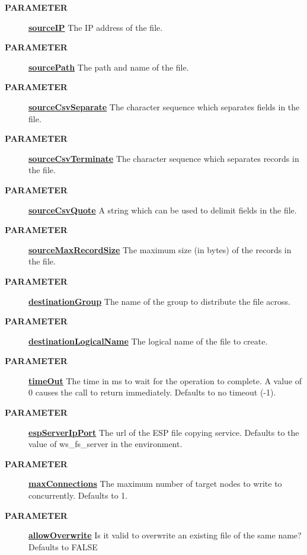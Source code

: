 \par
\begin{description}
\item [\colorbox{tagtype}{\color{white} \textbf{\textsf{PARAMETER}}}] \textbf{\underline{sourceIP}} The IP address of the file.
\item [\colorbox{tagtype}{\color{white} \textbf{\textsf{PARAMETER}}}] \textbf{\underline{sourcePath}} The path and name of the file.
\item [\colorbox{tagtype}{\color{white} \textbf{\textsf{PARAMETER}}}] \textbf{\underline{sourceCsvSeparate}} The character sequence which separates fields in the file.
\item [\colorbox{tagtype}{\color{white} \textbf{\textsf{PARAMETER}}}] \textbf{\underline{sourceCsvTerminate}} The character sequence which separates records in the file.
\item [\colorbox{tagtype}{\color{white} \textbf{\textsf{PARAMETER}}}] \textbf{\underline{sourceCsvQuote}} A string which can be used to delimit fields in the file.
\item [\colorbox{tagtype}{\color{white} \textbf{\textsf{PARAMETER}}}] \textbf{\underline{sourceMaxRecordSize}} The maximum size (in bytes) of the records in the file.
\item [\colorbox{tagtype}{\color{white} \textbf{\textsf{PARAMETER}}}] \textbf{\underline{destinationGroup}} The name of the group to distribute the file across.
\item [\colorbox{tagtype}{\color{white} \textbf{\textsf{PARAMETER}}}] \textbf{\underline{destinationLogicalName}} The logical name of the file to create.
\item [\colorbox{tagtype}{\color{white} \textbf{\textsf{PARAMETER}}}] \textbf{\underline{timeOut}} The time in ms to wait for the operation to complete. A value of 0 causes the call to return immediately. Defaults to no timeout (-1).
\item [\colorbox{tagtype}{\color{white} \textbf{\textsf{PARAMETER}}}] \textbf{\underline{espServerIpPort}} The url of the ESP file copying service. Defaults to the value of ws\_fs\_server in the environment.
\item [\colorbox{tagtype}{\color{white} \textbf{\textsf{PARAMETER}}}] \textbf{\underline{maxConnections}} The maximum number of target nodes to write to concurrently. Defaults to 1.
\item [\colorbox{tagtype}{\color{white} \textbf{\textsf{PARAMETER}}}] \textbf{\underline{allowOverwrite}} Is it valid to overwrite an existing file of the same name? Defaults to FALSE

\end{description}
